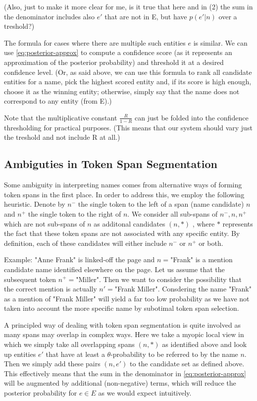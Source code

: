 \documentclass{article}
\begin{document}
\par {\color{blue} (Also, just to make it more clear for me, is it true that here and in (2) the sum in the denominator includes also $e'$ that are not in E, but have $p(e'|n)$ over a treshold?)}


The formula for cases where there are multiple such entities $e$ is similar. We can use \eqref{eq:posterior-approx} to compute a confidence score (as it represents an approximation of the posterior probability) and threshold it at a desired confidence level. {\color{blue} (Or, as said above, we can use this formula to rank all candidate entities for a name, pick the highest scored entity and, if its score is high enough, choose it as the winning entity; otherwise, simply say that the name does not correspond to any entity (from E).)}

 Note that the multiplicative constant $\frac{R}{1-R}$ can just be folded into the confidence thresholding for practical purposes. {\color{blue} (This means that our system should vary just the treshold and not include R at all.)}


\subsection*{Ambiguties in Token Span Segmentation}

Some ambiguity in interpreting names comes from alternative ways of forming token spans in the first place. In order to address this, we employ the following heuristic. Denote by $n^-$ the single token to the left of a span (name candidate) $n$ and $n^+$ the single token to the right of $n$. We consider all sub-spans of $n^-,n,n^+$ which are not sub-spans of $n$ as additonal candidates $(n,*)$ 
, where $*$ represents the fact that these token spans are not associated with any specific entity. By definition, each of these candidates will either include $n^-$ or $n^+$ or both. 

 Example: "Anne Frank" is linked-off the page and $n=$"Frank" is a mention candidate name identified elsewhere on the page. Let us assume that the subsequent token $n^+=$"Miller". Then we want to consider the possibility that the correct mention is actually $n'=$"Frank Miller". Consdering the name "Frank" as a mention of "Frank Miller" will yield a far too low probability as we have not taken into account the more specific name by subotimal token span selection. 
 
A principled way of dealing with token span segmentation is quite involved as many spans may overlap in complex ways. Here we take a myopic local view in which we simply take all overlapping spans $(n,*)$ as identified above and look up entities $e'$ that have at least a $\theta$-probability to be referred to by the name $n$. Then we simply add these pairs $(n,e')$ to the candidate set as defined above. This effectively means that the sum in the denominator in \eqref{eq:posterior-approx} will be augmented by additional (non-negative) terms, which will reduce the posterior probability for $e \in E$ as we would expect intuitively.  
\end{document}
